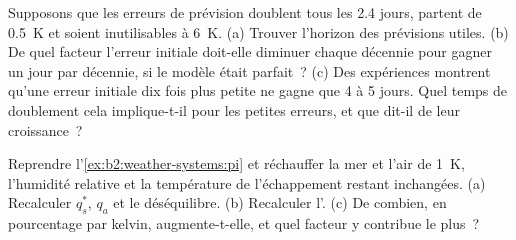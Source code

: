 \begin{exercise}[$\star\star\star$]\label{exo:b2:weather-systems:11}
Supposons que les erreurs de prévision doublent tous les 2.4 jours, partent de \qty{0.5}{K} et soient inutilisables à
\qty{6}{K}. (a) Trouver l'horizon des prévisions utiles. (b) De quel facteur l'erreur initiale doit-elle diminuer
chaque décennie pour gagner un jour par décennie, si le modèle était parfait~? (c) Des expériences montrent qu'une erreur
initiale dix fois plus petite ne gagne que 4 à 5 jours. Quel temps de doublement cela implique-t-il pour
les petites erreurs, et que dit-il de leur croissance~?
\end{exercise}

\begin{exercise}[$\star\star\star$]\label{exo:b2:weather-systems:12}
Reprendre l'\cref{ex:b2:weather-systems:pi} et réchauffer la mer et l'air de \qty{1}{K}, l'humidité relative
et la température de l'échappement restant inchangées. (a) Recalculer $q_s^*$, $q_a$ et le
déséquilibre. (b) Recalculer l'. (c) De combien, en pourcentage par kelvin,
augmente-t-elle, et quel facteur y contribue le plus~?
\end{exercise}


